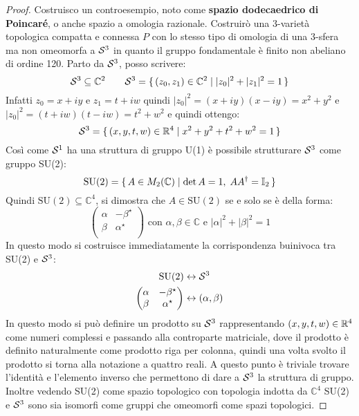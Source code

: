 \begin{proof}
  Costruisco un controesempio, noto come \textbf{spazio dodecaedrico di
    Poincaré}, o anche spazio a omologia
  razionale.
  Costruirò una $ 3 $-varietà topologica compatta e connessa $ P $ con lo stesso
  tipo di omologia di una $ 3 $-sfera ma non omeomorfa a $ \mathcal{S}^{3} $ in quanto
  il gruppo fondamentale è finito non abeliano di ordine 120. Parto da
  $ \mathcal{S}^{3} $, posso scrivere:
  \[
    \mathcal{S}^{3} \subseteq \mathbb{C}^2 \qquad \mathcal{S}^{3} = \set{ (z_0, z_1) \in \mathbb{C}^2 | |z_0|^2 + |z_1|^2 = 1}
  \]
  Infatti $ z_0 = x + i y $ e $ z_1 = t + i w $ quindi $ |z_0|^2 = (x + iy)(x - iy) = x^2 + y^2 $
  e $ |z_0|^2 = (t + iw)(t - iw) = t^2 + w^2 $ e quindi ottengo:
  \[
    \mathcal{S}^{3} = \set{ (x,y,t,w) \in \mathbb{R}^{4} | x^2 + y^2 + t^2 + w^2 = 1}
  \]
  Così come $ \mathcal{S}^{1} $ ha una struttura di gruppo U(1) è possibile strutturare
  $ \mathcal{S}^{3} $ come gruppo SU(2):
  \[
    \mathrm{SU(2)} = \set{A \in M_2(\mathbb{C}) | \det{A} = 1, \; AA^\dagger = \mathbb{I}_{2}}
  \]
  Quindi $ \mathrm{SU(2)} \subseteq \mathbb{C}^4 $, si dimostra che $ A \in \mathrm{SU(2)} $ se e solo se
  è della forma:
  \[
    \begin{pmatrix}
      \alpha & - \beta^\star \\
      \beta & \alpha^\star \\
    \end{pmatrix}
    \text{ con } \alpha,\beta \in \mathbb{C} \text{ e } |\alpha|^2 + |\beta|^2 = 1
  \]
  In questo modo si costruisce immediatamente la corrispondenza buinivoca tra
  SU(2) e $ \mathcal{S}^{3} $:
  \begin{align*}
    \mathrm{SU(2)} & \leftrightarrow \mathcal{S}^{3} \\
    \begin{pmatrix}
      \alpha & - \beta^\star \\
      \beta & \alpha^\star \\
    \end{pmatrix} & \leftrightarrow (\alpha,\beta)
  \end{align*}
  In questo modo si può definire un prodotto su $ \mathcal{S}^{3} $ rappresentando
  $ (x,y,t,w) \in \mathbb{R}^{4} $ come numeri complessi e passando alla controparte
  matriciale, dove il prodotto è definito naturalmente come prodotto riga per
  colonna, quindi una volta svolto il prodotto si torna alla notazione a quattro
  reali. A questo punto è triviale trovare l'identità e l'elemento inverso che
  permettono di dare a $ \mathcal{S}^{3} $ la struttura di gruppo. Inoltre vedendo SU(2)
  come spazio topologico con topologia indotta da $ \mathbb{C}^4 $ SU(2) e
  $ \mathcal{S}^{3} $ sono sia isomorfi come gruppi che omeomorfi come spazi topologici.


\end{proof}
